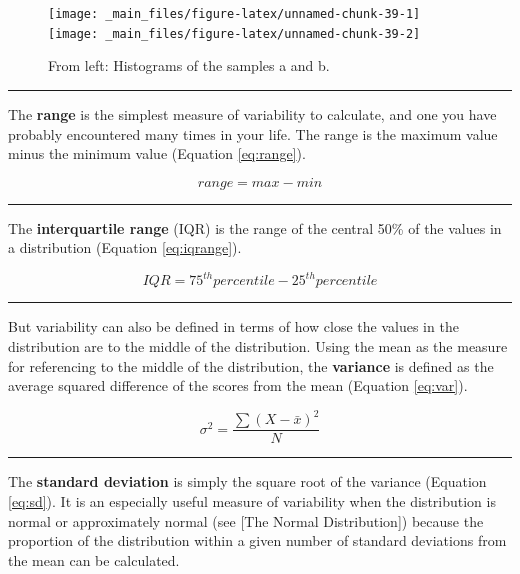 \documentclass[
]{article}
\begin{document}
\begin{figure}[H]
\texttt{[image: \_main\_files/figure-latex/unnamed-chunk-39-1]} \texttt{[image: \_main\_files/figure-latex/unnamed-chunk-39-2]} \caption{From left: Histograms of the samples a and b.}\label{fig:unnamed-chunk-39}
\end{figure}

\begin{center}\rule{0.5\linewidth}{0.5pt}\end{center}

The \textbf{range} is the simplest measure of variability to calculate, and
one you have probably encountered many times in your life. The range is
the maximum value minus the minimum value (Equation \eqref{eq:range}).

\begin{equation}
range=max-min
\label{eq:range}
\end{equation}

\begin{center}\rule{0.5\linewidth}{0.5pt}\end{center}

The \textbf{interquartile range} (IQR) is the range of the central 50\% of the
values in a distribution (Equation \eqref{eq:iqrange}).

\begin{equation}
IQR=75^{th} percentile - 25^{th} percentile
\label{eq:iqrange}
\end{equation}

\begin{center}\rule{0.5\linewidth}{0.5pt}\end{center}

But variability can also be defined in terms of how close the values in
the distribution are to the middle of the distribution. Using the mean
as the measure for referencing to the middle of the distribution, the
\textbf{variance} is defined as the average squared difference of the scores
from the mean (Equation \eqref{eq:var}).

\begin{equation}
\sigma^2=\frac{\sum{(X-\bar x)^2}}{N}
\label{eq:var}
\end{equation}

\begin{center}\rule{0.5\linewidth}{0.5pt}\end{center}

The \textbf{standard deviation} is simply the square root of the variance
(Equation \eqref{eq:sd}). It is an especially useful measure of variability when
the distribution is normal or approximately normal (see {[}The Normal
Distribution{]}) because the proportion of the distribution within a given
number of standard deviations from the mean can be calculated.
\end{document}
